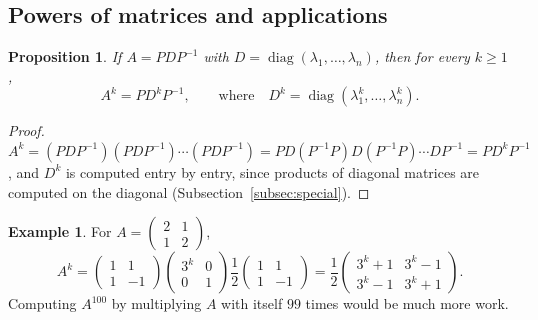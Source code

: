 \documentclass[11pt]{article}
\theoremstyle{definition}
\newtheorem{example}[definition]{Example}
\theoremstyle{plain}
\newtheorem{proposition}[definition]{Proposition}
\theoremstyle{remark}
\DeclareMathOperator{\diag}{diag}
\begin{document}
\subsection{Powers of matrices and applications}

\begin{proposition}\label{prop:powers}
    If $A = PDP^{-1}$ with $D = \diag(\lambda_1, \ldots, \lambda_n)$, then for every $k \geq 1$,
    \[A^k = P D^k P^{-1}, \qquad \text{where} \quad D^k = \diag(\lambda_1^k, \ldots, \lambda_n^k).\]
\end{proposition}

\begin{proof}
    $A^k = (PDP^{-1})(PDP^{-1}) \cdots (PDP^{-1}) = PD(P^{-1}P)D(P^{-1}P) \cdots DP^{-1} = PD^kP^{-1}$, and $D^k$ is computed entry by entry, since products of diagonal matrices are computed on the diagonal (Subsection~\ref{subsec:special}).
\end{proof}

\begin{example}
    For $A = \begin{pmatrix} 2 & 1 \\ 1 & 2 \end{pmatrix}$,
    \[A^k = \begin{pmatrix} 1 & 1 \\ 1 & -1 \end{pmatrix} \begin{pmatrix} 3^k & 0 \\ 0 & 1 \end{pmatrix} \frac{1}{2}\begin{pmatrix} 1 & 1 \\ 1 & -1 \end{pmatrix} = \frac{1}{2} \begin{pmatrix} 3^k + 1 & 3^k - 1 \\ 3^k - 1 & 3^k + 1 \end{pmatrix}.\]
    Computing $A^{100}$ by multiplying $A$ with itself $99$ times would be much more work.
\end{example}
\end{document}
